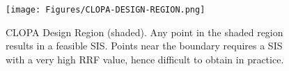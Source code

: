 \documentclass[journal]{IEEEtran}
\begin{document}
\begin{figure}[]
\centering
\texttt{[image: Figures/CLOPA-DESIGN-REGION.png]}
\caption{CLOPA Design Region (shaded). Any point in the shaded region results in a feasible SIS. Points near the boundary requires a SIS with a very high RRF value, hence difficult to obtain in practice.}
\label{fig:design-region-cyber-prob}
\end{figure}
\end{document}

